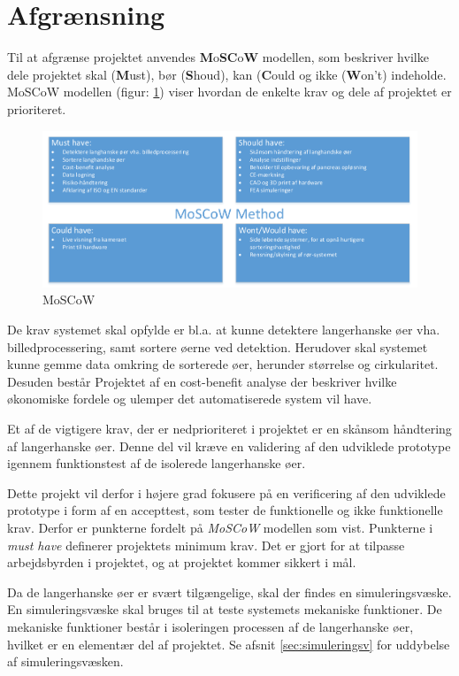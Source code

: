 \newpage
\section{Afgrænsning}
Til at afgrænse projektet anvendes \textbf{M}o\textbf{SC}o\textbf{W} modellen, som beskriver hvilke dele projektet skal (\textbf{M}ust), bør (\textbf{S}houd), kan (\textbf{C}ould og ikke (\textbf{W}on't) indeholde. MoSCoW modellen (figur: \ref{fig:moscow}) viser hvordan de enkelte krav og dele af projektet er prioriteret. 


\begin{figure}[H]
	\centering
	\includegraphics[width=1\textwidth]{billeder/MoSCoW-crop.pdf}
	\caption{MoSCoW}
	\label{fig:moscow}
\end{figure}

De krav systemet skal opfylde er bl.a. at kunne detektere langerhanske øer vha. billedprocessering, samt sortere øerne ved detektion. Herudover skal systemet kunne gemme data omkring de sorterede øer, herunder størrelse og cirkularitet. Desuden består Projektet af en cost-benefit analyse der beskriver hvilke økonomiske fordele og ulemper det automatiserede system vil have. 

Et af de vigtigere krav, der er nedprioriteret i projektet er en skånsom håndtering af langerhanske øer. Denne del vil kræve en validering af den udviklede prototype igennem funktionstest af de isolerede langerhanske øer. %

Dette projekt vil derfor i højere grad fokusere på en verificering af den udviklede prototype i form af en accepttest, som tester de funktionelle og ikke funktionelle krav. Derfor er punkterne  fordelt på \textit{MoSCoW} modellen som vist. Punkterne i \textit{must have} definerer projektets minimum krav. Det er gjort for at tilpasse arbejdsbyrden i projektet, og at projektet kommer sikkert i mål.

Da de langerhanske øer er svært tilgængelige, skal der findes en simuleringsvæske. En simuleringsvæske skal bruges til at teste systemets mekaniske funktioner. De mekaniske funktioner består i isoleringen processen af de langerhanske øer, hvilket er en elementær del af projektet. Se afsnit \ref{sec:simuleringsv} for uddybelse af simuleringsvæsken.

